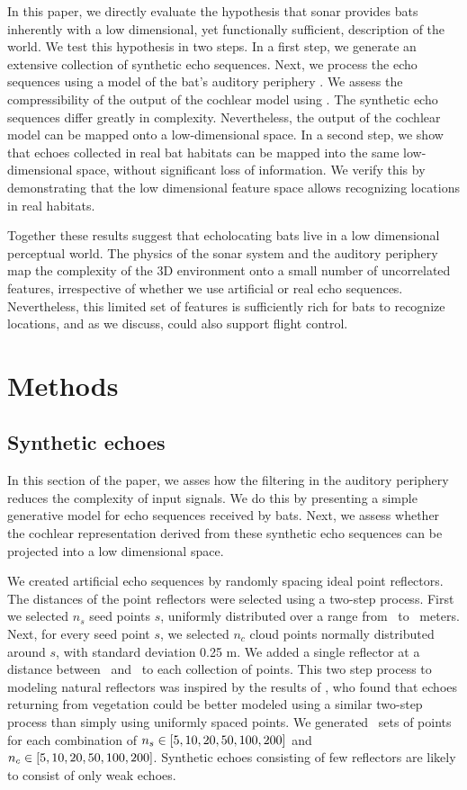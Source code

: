\documentclass[preprint,5p]{elsarticle}
\begin{document}
In this paper, we directly evaluate the hypothesis that sonar provides bats inherently with a low dimensional, yet functionally sufficient, description of the world. We test this hypothesis in two steps. In a first step, we generate an extensive collection of synthetic echo sequences. Next, we process the echo sequences using a model of the bat's auditory periphery \citep{Wiegrebe2008}. We assess the compressibility of the output of the cochlear model using \PCA. The synthetic echo sequences differ greatly in complexity. Nevertheless, the output of the cochlear model can be mapped onto a low-dimensional space. In a second step, we show that echoes collected in real bat habitats can be mapped into the same low-dimensional space, without significant loss of information. We verify this by demonstrating that the low dimensional feature space allows recognizing locations in real habitats. 

Together these results suggest that echolocating bats live in a low dimensional perceptual world. The physics of the sonar system and the auditory periphery map the complexity of the 3D environment onto a small number of uncorrelated features, irrespective of whether we use artificial or real echo sequences. Nevertheless, this limited set of features is sufficiently rich for bats to recognize locations, and as we discuss, could also support flight control.

\section{Methods}

\subsection{Synthetic echoes}

In this section of the paper, we asses how the filtering in the auditory periphery reduces the complexity of input signals. We do this by presenting a simple generative model for echo sequences received by bats. Next, we assess whether the cochlear representation derived from these synthetic echo sequences can be projected into a low dimensional space. 

We created artificial echo sequences by randomly spacing ideal point reflectors. The distances of the point reflectors were selected using a two-step process. First we selected $n_{s}$ seed points $s$, uniformly distributed over a range from \MinDistance\ to \MaxDistance\ meters. Next, for every seed point $s$, we selected $n_{c}$ cloud points normally distributed around $s$, with standard deviation 0.25 m. We added a single reflector at a distance between \MinDistanceFirst\ and \MaxDistanceFirst\ to each collection of points. This two step process to modeling natural reflectors was inspired by the results of \citet{Yovel2009}, who found that echoes returning from vegetation could be better modeled using a similar two-step process than simply using uniformly spaced points. We generated \GenerateRepeats\ sets of points for each combination of $n_s \in [5, 10, 20, 50, 100, 200]$ and $n_c \in [5, 10, 20, 50, 100, 200]$. Synthetic echoes consisting of few reflectors are likely to consist of only weak echoes.
\end{document}
